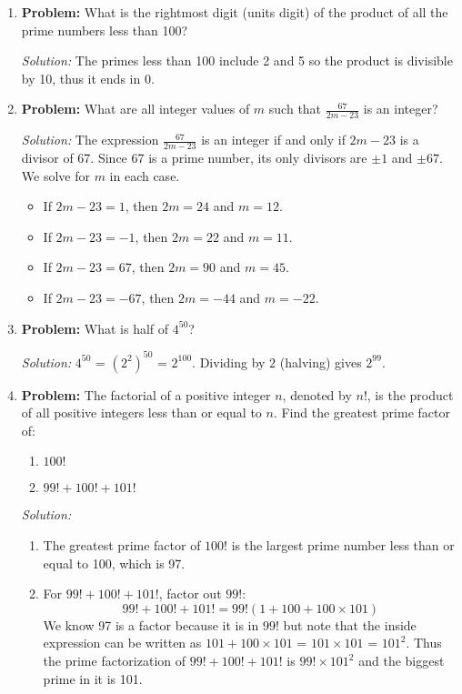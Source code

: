 \documentclass{article}
\begin{document}
\begin{enumerate}
    \item \textbf{Problem:} What is the rightmost digit (units digit) of the product of all the prime numbers less than 100?
    
    \textit{Solution:} The primes less than 100 include 2 and 5 so the product is divisible by 10, thus it ends in 0.

    \item \textbf{Problem:} What are all integer values of $m$ such that $\frac{67}{2m-23}$ is an integer?
    
    \textit{Solution:} The expression $\frac{67}{2m-23}$ is an integer if and only if $2m-23$ is a divisor of 67. Since 67 is a prime number, its only divisors are $\pm 1$ and $\pm 67$. We solve for $m$ in each case.
    \begin{itemize}
        \item If \(2m - 23 = 1\), then \(2m = 24\) and \(m = 12\).
        \item If \(2m - 23 = -1\), then \(2m = 22\) and \(m = 11\).
        \item If \(2m - 23 = 67\), then \(2m = 90\) and \(m = 45\).
        \item If \(2m - 23 = -67\), then \(2m = -44\) and \(m = -22\).
    \end{itemize}

    \item \textbf{Problem:} What is half of $4^{50}$?
    
    \textit{Solution:} $4^{50}$ = $(2^{2})^{50}$ = $2^{100}$. Dividing by $2$ (halving) gives $2^{99}$.

     \item \textbf{Problem:} The factorial of a positive integer $n$, denoted by $n!$, is the product of all positive integers less than or equal to $n$. Find the greatest prime factor of:
    \begin{enumerate}
        \item $100!$
        \item $99! + 100! + 101!$
    \end{enumerate}

    \textit{Solution:}
    \begin{enumerate}
        \item The greatest prime factor of $100!$ is the largest prime number less than or equal to 100, which is 97.
        \item For $99! + 100! + 101!$, factor out $99!$:
        $$99! + 100! + 101! = 99!(1 + 100 + 100 \times 101)$$
        We know 97 is a factor because it is in $99!$ but note that the inside expression can be written as $101+100\times101$ = $101\times101$ = $101^{2}$. Thus the prime factorization of $99! + 100! + 101!$ is $99!\times101^{2}$ and the biggest prime in it is 101.
        

\end{enumerate}
\end{enumerate}
\end{document}
